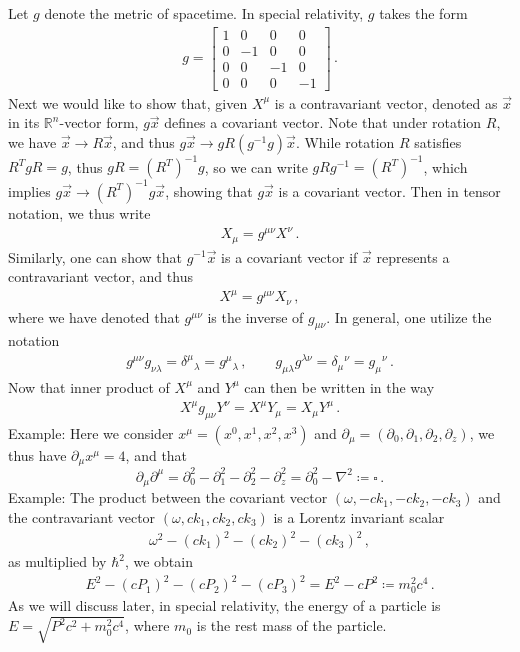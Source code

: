 \documentclass[11pt, onesided]{book}
\theoremstyle{break}
\theoremstyle{break}
\newcommand{\R}{\mathbb{R}}
\newcommand{\pd}{\partial}
\newcommand{\bmat}[1]{\begin{bmatrix} #1 \end{bmatrix}}
\newcommand{\example}{\color{green}Example: \color{black}}
\begin{document}
Let $g$ denote the metric of spacetime. In special relativity, $g$ takes the form
\begin{align*}
g = \bmat{1 & 0 & 0 & 0\\
0 & -1 & 0 & 0\\
0 & 0 & -1 & 0\\
0 & 0 & 0 & -1}\,.
\end{align*}
Next we would like to show that, given $X^\mu$ is a contravariant vector, denoted as $\vec{x}$ in its $\R^n$-vector form, $g\vec{x}$ defines a covariant vector. Note that under rotation $R$, we have $\vec{x}\to R\vec{x}$, and thus $g\vec{x} \to gR(g^{-1}g)\vec{x}$. While rotation $R$ satisfies $R^TgR = g$, thus $gR = (R^T)^{-1} g$, so we can write $gRg^{-1} = (R^T)^{-1}$, which implies $g\vec{x}\to (R^T)^{-1}g\vec{x}$, showing that $g\vec{x}$ is a covariant vector. Then in tensor notation, we thus write
\begin{align*}
X_\mu = g^{\mu\nu}X^\nu\,.
\end{align*}
Similarly, one can show that $g^{-1}\vec{x}$ is a covariant vector if $\vec{x}$ represents a contravariant vector, and thus
\begin{align*}
X^\mu = g^{\mu\nu}X_\nu\,,
\end{align*}
where we have denoted that $g^{\mu\nu}$ is the inverse of $g_{\mu\nu}$. In general, one utilize the notation 
\begin{align*}
g^{\mu\nu}g_{\nu \lambda} = \delta^\mu{}_\lambda = g^{\mu}{}_\lambda\,,\qquad
g_{\mu\lambda}g^{\lambda\nu} = \delta_\mu{}^\nu = g_\mu{}^\nu\,.
\end{align*}
Now that inner product of $X^\mu$ and $Y^\mu$ can then be written in the way
\begin{align*}
X^\mu g_{\mu\nu} Y^\nu=X^\mu Y_\mu = X_\mu Y^\mu \,.
\end{align*}
\example Here we consider $x^\mu = (x^0,x^1,x^2,x^3)$ and $\pd_\mu = (\pd_0,\pd_1,\pd_2,\pd_z)$, we thus have $\pd_\mu x^\mu = 4$, and that 
$$\pd_\mu \pd^\mu = \pd_0^2 - \pd_1^2 - \pd_2^2 - \pd_z^2 = \pd_0^2 - \nabla^2 \coloneqq \square\,.$$
\example The product between the covariant vector $(\omega, -ck_1, -ck_2, -ck_3)$ and the contravariant vector $(\omega, ck_1, ck_2, ck_3)$ is a Lorentz invariant scalar
\begin{align*}
\omega^2 -( ck_1)^2 - (ck_2)^2 - (ck_3)^2\,,
\end{align*}
as multiplied by $\hbar^2$, we obtain
\begin{align*}
E^2 - (cP_1)^2 - (cP_2)^2 - (cP_3)^2 = E^2 - cP^2 \coloneqq m_0^2 c^4\,.
\end{align*}
As we will discuss later, in special relativity, the energy of a particle is $E = \sqrt{P^2c^2 +m_0^2 c^4}$, where $m_0$ is the rest mass of the particle. \\
\end{document}

